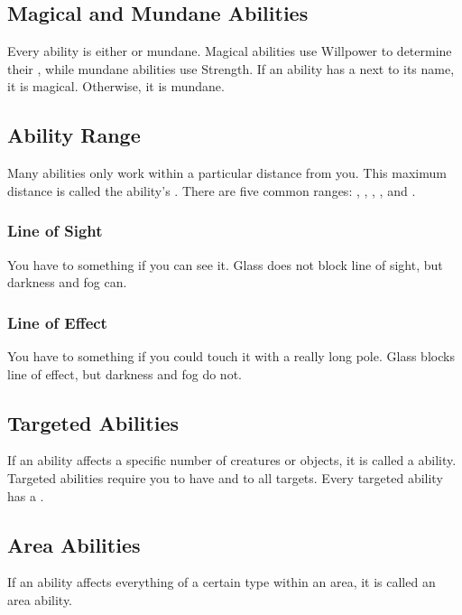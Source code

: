   \subsection{Magical and Mundane Abilities}\label{Magical and Mundane Abilities}
    Every ability is either \magical or mundane.
    Magical abilities use Willpower to determine their , while mundane abilities use Strength.
    If an ability has a \sparkle{} next to its name, it is magical.
    Otherwise, it is mundane.

  \subsection{Ability Range}\label{Ability Range}
    Many abilities only work within a particular distance from you.
    This maximum distance is called the ability's .
    There are five common ranges: \shortrange, \medrange, \longrange, \distrange, and \extrange.

  \subsubsection{Line of Sight}
    You have  to something if you can see it.
    Glass does not block line of sight, but darkness and fog can.

  \subsubsection{Line of Effect}
    You have  to something if you could touch it with a really long pole.
    Glass blocks line of effect, but darkness and fog do not.

  \subsection{Targeted Abilities}\label{Targeted Abilities}
    If an ability affects a specific number of creatures or objects, it is called a  ability.
    Targeted abilities require you to have  and  to all targets.
    Every targeted ability has a .

  \subsection{Area Abilities}\label{Area Abilities}
    If an ability affects everything of a certain type within an area, it is called an area ability.


